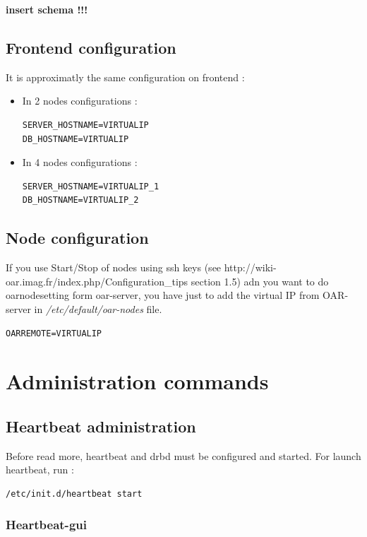 \documentclass[a4paper,10pt]{report}
\begin{document}
\textbf{insert schema !!!}

\subsection{Frontend configuration}
It is approximatly the same configuration on frontend :\\
\begin{itemize}
 \item In 2 nodes configurations :
\begin{lstlisting}
SERVER_HOSTNAME=VIRTUALIP
DB_HOSTNAME=VIRTUALIP
\end{lstlisting}
\item In 4 nodes configurations :
\begin{lstlisting}
SERVER_HOSTNAME=VIRTUALIP_1
DB_HOSTNAME=VIRTUALIP_2
\end{lstlisting}
\end{itemize}

\subsection{Node configuration}
If you use Start/Stop of nodes using ssh keys (see http://wiki-oar.imag.fr/index.php/Configuration\_tips section 1.5) adn you want to do oarnodesetting form oar-server, 
you have just to add the virtual IP from OAR-server in \textit{/etc/default/oar-nodes} file.
\begin{lstlisting}
OARREMOTE=VIRTUALIP
\end{lstlisting}

\section{Administration commands}

\subsection{Heartbeat administration}

Before read more, heartbeat and drbd must be configured and started. For launch heartbeat, run :
\begin{lstlisting}
/etc/init.d/heartbeat start
\end{lstlisting}


\subsubsection{Heartbeat-gui}
\end{document}
